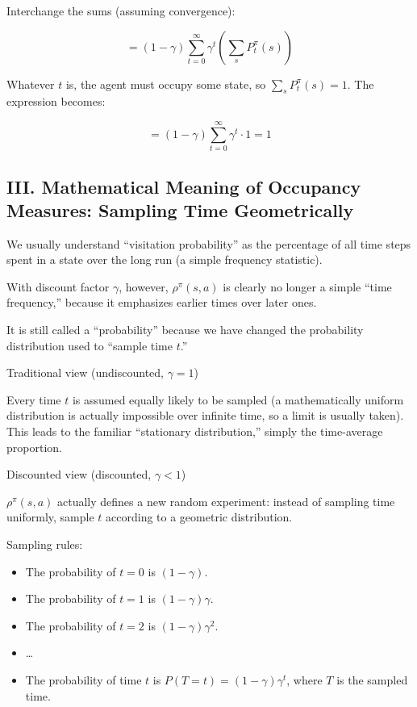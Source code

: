 Interchange the sums (assuming convergence):

\[
= (1-\gamma)\sum_{t=0}^{\infty}\gamma^t\left(\sum_s P_t^\pi(s)\right)
\]

Whatever \(t\) is, the agent must occupy some state, so \(\sum_s P_t^\pi(s)=1\). The expression becomes:

\[
= (1-\gamma)\sum_{t=0}^{\infty}\gamma^t \cdot 1 = 1
\]

\hypertarget{iii.-mathematical-meaning-of-occupancy-measures-sampling-time-geometrically}{%
\subsection{III. Mathematical Meaning of Occupancy Measures: Sampling Time Geometrically}\label{iii.-mathematical-meaning-of-occupancy-measures-sampling-time-geometrically}}

We usually understand ``visitation probability'' as the percentage of all time steps spent in a state over the long run (a simple frequency statistic).

With discount factor \(\gamma\), however, \(\rho^\pi(s,a)\) is clearly no longer a simple ``time frequency,'' because it emphasizes earlier times over later ones.

It is still called a ``probability'' because we have changed the probability distribution used to ``sample time \(t\).''

Traditional view (undiscounted, \(\gamma=1\))

Every time \(t\) is assumed equally likely to be sampled (a mathematically uniform distribution is actually impossible over infinite time, so a limit is usually taken). This leads to the familiar ``stationary distribution,'' simply the time-average proportion.

Discounted view (discounted, \(\gamma<1\))

\(\rho^\pi(s,a)\) actually defines a new random experiment: instead of sampling time uniformly, sample \(t\) according to a geometric distribution.

Sampling rules:

\begin{itemize}
\tightlist
\item
  The probability of \(t=0\) is \((1-\gamma)\).
\item
  The probability of \(t=1\) is \((1-\gamma)\gamma\).
\item
  The probability of \(t=2\) is \((1-\gamma)\gamma^2\).
\item
  \ldots{}
\item
  The probability of time \(t\) is \(P(T=t)=(1-\gamma)\gamma^t\), where \(T\) is the sampled time.
\end{itemize}


